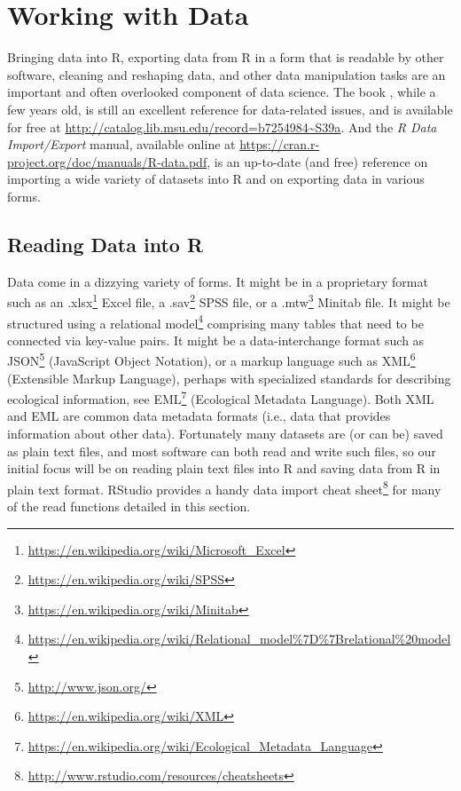 \documentclass[
]{krantz}
\renewcommand{\href}[2]{#2\footnote{\url{#1}}}
\begin{document}
\hypertarget{data2}{%
\chapter{Working with Data}\label{data2}}

Bringing data into R, exporting data from R in a form that is readable by other software, cleaning and reshaping data, and other data manipulation tasks are an important and often overlooked component of data science. The book \citet{SpectorDataManipulation}, while a few years old, is still an excellent reference for data-related issues, and is available for free at \url{http://catalog.lib.msu.edu/record=b7254984~S39a}. And the \emph{R Data Import/Export} manual, available online at \url{https://cran.r-project.org/doc/manuals/R-data.pdf}, is an up-to-date (and free) reference on importing a wide variety of datasets into R and on exporting data in various forms.

\hypertarget{reading-data-into-r}{%
\section{Reading Data into R}\label{reading-data-into-r}}

Data come in a dizzying variety of forms. It might be in a proprietary format such as an \href{https://en.wikipedia.org/wiki/Microsoft_Excel}{.xlsx} Excel file, a \href{https://en.wikipedia.org/wiki/SPSS}{.sav} SPSS file, or a \href{https://en.wikipedia.org/wiki/Minitab}{.mtw} Minitab file. It might be structured using a \href{https://en.wikipedia.org/wiki/Relational_model\%7D\%7Brelational\%20model}{relational model} comprising many tables that need to be connected via key-value pairs. It might be a data-interchange format such as \href{http://www.json.org/}{JSON} (JavaScript Object Notation), or a markup language such as \href{https://en.wikipedia.org/wiki/XML}{XML} (Extensible Markup Language), perhaps with specialized standards for describing ecological information, see \href{https://en.wikipedia.org/wiki/Ecological_Metadata_Language}{EML} (Ecological Metadata Language). Both XML and EML are common data metadata formats (i.e., data that provides information about other data). Fortunately many datasets are (or can be) saved as plain text files, and most software can both read and write such files, so our initial focus will be on reading plain text files into R and saving data from R in plain text format. RStudio provides a handy \href{http://www.rstudio.com/resources/cheatsheets}{data import cheat sheet} for many of the read functions detailed in this section.
\end{document}

